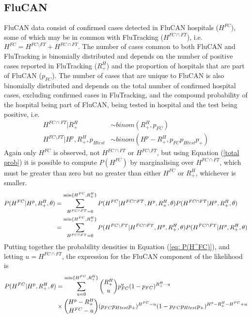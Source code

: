 \subsection{FluCAN}
FluCAN data consist of confirmed cases detected in FluCAN hospitals ($H^{FC}$), some of which may be in common with FluTracking ($H^{FC \cap FT}$), i.e. $H^{FC} = H^{FC\setminus FT} + H^{FC\cap FT}$. The number of cases common to both FluCAN and FluTracking is binomially distributed and depends on the number of positive cases reported in FluTracking ($R_+^H$) and the proportion of hospitals that are part of FluCAN ($p_{FC}$). The number of cases that are unique to FluCAN is also binomially distributed and depends on the total number of confirmed hospital cases, excluding confirmed cases in FluTracking, and the compound probability of the hospital being part of FluCAN, being tested in hospital and the test being positive, i.e.
\begin{align}
	H^{FC\cap FT} | R_+^H &\sim binom(R_+^H, p_{FC}) \\
	H^{FC\setminus FT} | H^p, R_+^H, p_{Htest} &\sim binom(H^p-R_+^H, p_{FC}p_{Htest}p_+) 
\end{align}
Again only $H^{FC}$ is observed, not $H^{FC\cap FT}$ or $H^{FC\setminus FT}$, but using Equation (\ref{total prob}) it is possible to compute $P(H^{FC})$ by marginalising over $H^{FC\cap FT}$, which must be greater than zero but no greater than either $H^{FC}$ or $R_+^H$, whichever is smaller. 
\begin{align} \label{eq: P(H^FC)} \notag
	P(H^{FC}| H^p, R_+^H, \theta) &= \sum_{H^{FC\cap FT}=0}^{\min\{H^{FC},R_+^H\}} P(H^{FC}|H^{FC\cap FT}, H^p, R_+^H, \theta) P(H^{FC\cap FT} | H^p, R_+^H, \theta) \\
	&= \sum_{H^{FC\cap FT}=0}^{\min\{H^{FC},R_+^H\}} P(H^{FC\setminus FT}|H^{FC\cap FT}, H^p, R_+^H, \theta) P(H^{FC\cap FT} | H^p, R_+^H, \theta)
\end{align}
Putting together the probability densities in Equation (\ref{eq: P(H^FC)}), and letting $u=H^{FC\cap FT}$, the expression for the FluCAN component of the likelihood is
\begin{align} \notag
	P(H^{FC} | H^p, R_+^H, \theta) &= \sum_{u=0}^{\min\{H^{FC},R_+^H\}} \binom{R_+^H}{u} p_{FC}^{u} (1-p_{FC})^{R_+^H-u} \\ \label{P(FC)}
	&\times \binom{H^p - R_+^H}{H^{FC} - u} (p_{FC}p_{Htest}p_+)^{H^{FC} - u} (1-p_{FC}p_{Htest}p_+)^{H^p - R_+^H - H^{FC} + u} 
\end{align}

